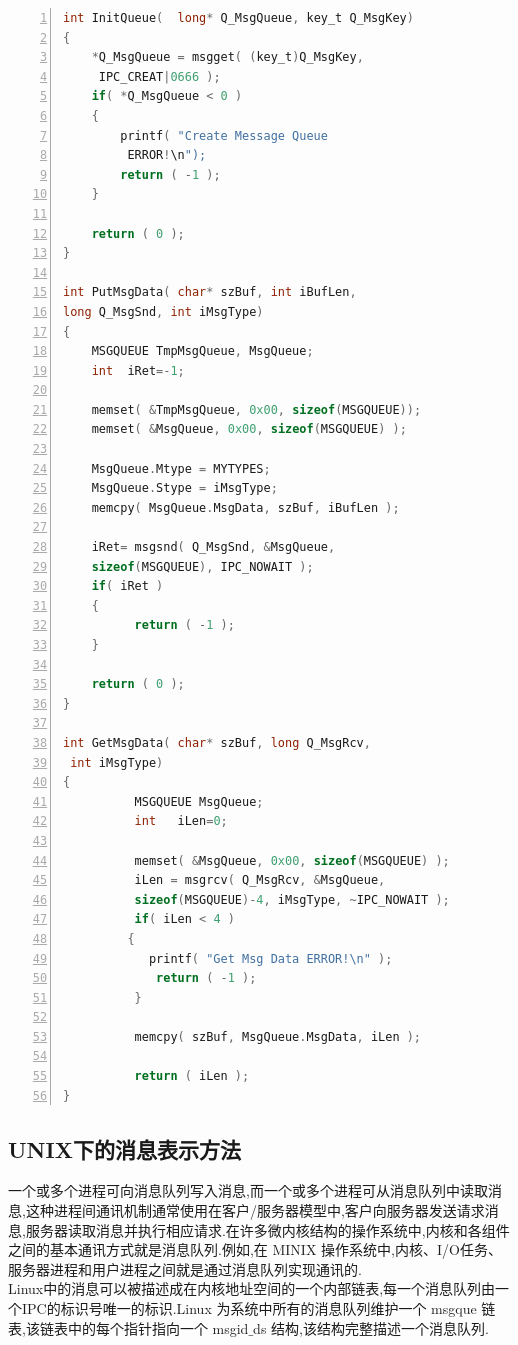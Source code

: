 \documentclass[a4paper,12pt,notitlepage]{article}
\begin{document}
\begin{lstlisting}[frame=shadowbox,numbers=left,language=C]
int InitQueue(  long* Q_MsgQueue, key_t Q_MsgKey)
{
	*Q_MsgQueue = msgget( (key_t)Q_MsgKey,
	 IPC_CREAT|0666 );
	if( *Q_MsgQueue < 0 )
	{
		printf( "Create Message Queue
		 ERROR!\n");
		return ( -1 );
	}

	return ( 0 );
}

int PutMsgData( char* szBuf, int iBufLen,  
long Q_MsgSnd, int iMsgType)
{
	MSGQUEUE TmpMsgQueue, MsgQueue;
	int  iRet=-1;

	memset( &TmpMsgQueue, 0x00, sizeof(MSGQUEUE));
	memset( &MsgQueue, 0x00, sizeof(MSGQUEUE) );

	MsgQueue.Mtype = MYTYPES;
	MsgQueue.Stype = iMsgType;
	memcpy( MsgQueue.MsgData, szBuf, iBufLen );

	iRet= msgsnd( Q_MsgSnd, &MsgQueue, 
	sizeof(MSGQUEUE), IPC_NOWAIT );
	if( iRet )
	{
	      return ( -1 );
	}

	return ( 0 );
}

int GetMsgData( char* szBuf, long Q_MsgRcv, 
 int iMsgType)
{
          MSGQUEUE MsgQueue;
          int   iLen=0;

          memset( &MsgQueue, 0x00, sizeof(MSGQUEUE) );
          iLen = msgrcv( Q_MsgRcv, &MsgQueue, 
          sizeof(MSGQUEUE)-4, iMsgType, ~IPC_NOWAIT );
          if( iLen < 4 )
         {
	        printf( "Get Msg Data ERROR!\n" );
	         return ( -1 );
          }

          memcpy( szBuf, MsgQueue.MsgData, iLen );

          return ( iLen );
}
\end{lstlisting}
	
\subsection{UNIX下的消息表示方法}

	一个或多个进程可向消息队列写入消息,而一个或多个进程可从消息队列中读取消息,这种进程间通讯机制通常使用在客户/服务器模型中,客户向服务器发送请求消息,服务器读取消息并执行相应请求.在许多微内核结构的操作系统中,内核和各组件之间的基本通讯方式就是消息队列.例如,在 MINIX 操作系统中,内核、I/O任务、服务器进程和用户进程之间就是通过消息队列实现通讯的.\\

	Linux中的消息可以被描述成在内核地址空间的一个内部链表,每一个消息队列由一个IPC的标识号唯一的标识.Linux 为系统中所有的消息队列维护一个 msgque 链表,该链表中的每个指针指向一个 msgid$\_$ds 结构,该结构完整描述一个消息队列.\\
\end{document}
